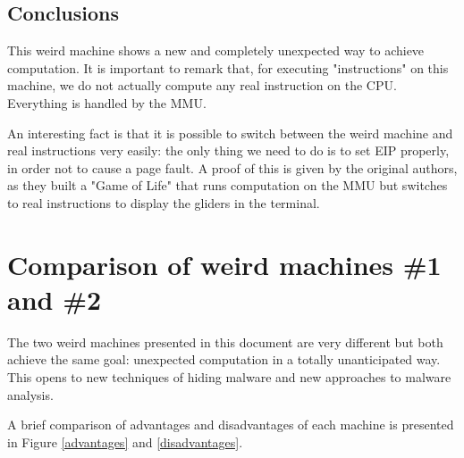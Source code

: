 \documentclass[11pt,twoside,a4paper]{article}
\begin{document}
\subsection{Conclusions}
This weird machine shows a new and completely unexpected way to achieve computation.
It is important to remark that, for executing "instructions" on this machine, we do not actually compute any real instruction on the CPU. Everything is handled by the MMU. 

An interesting fact is that it is possible to switch between the weird machine and real instructions very easily: the only thing we need to do is to set EIP properly, in order not to cause a page fault. A proof of this is given by the original authors, as they built a "Game of Life" that runs computation on the MMU but switches to real instructions to display the gliders in the terminal.


\section{Comparison of weird machines \#1 and \#2}

The two weird machines presented in this document are very different but both achieve the same goal: unexpected computation in a totally unanticipated way. 
This opens to new techniques of hiding malware and new approaches to malware analysis.

A brief comparison of advantages and disadvantages of each machine is presented in Figure \ref{advantages} and \ref{disadvantages}.
\end{document}
